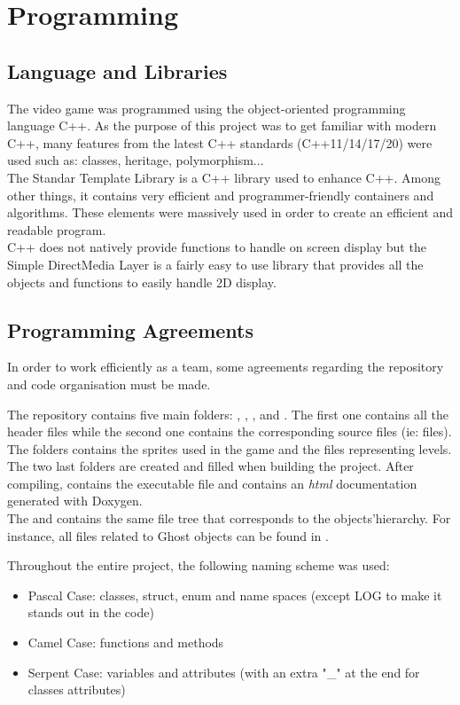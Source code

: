 \section{Programming}

\subsection{Language and Libraries}
The video game was programmed using the object-oriented programming language C++. As the purpose of this project was to get familiar with modern C++, many features from the latest C++ standards (C++11/14/17/20) were used such as: classes, heritage, polymorphism...\\
The Standar Template Library is a C++ library used to enhance C++. Among other things, it contains very efficient and programmer-friendly containers and algorithms. These elements were massively used in order to create an efficient and readable program.\\
C++ does not natively provide functions to handle on screen display but the Simple DirectMedia Layer is a fairly easy to use library that provides all the objects and functions to easily handle 2D display.\\

\subsection{Programming Agreements}
In order to work efficiently as a team, some agreements regarding the repository and code organisation must be made.

The repository contains five main folders: , , ,  and . The first one contains all the header files while the second one contains the corresponding source files (ie:  files). The  folders contains the sprites used in the game and the files representing levels. The two last folders are created and filled when building the project. After compiling,  contains the executable file and  contains an \textit{html} documentation generated with Doxygen.\cite{doxygen}\\
The  and  contains the same file tree that corresponds to the objects'hierarchy. For instance, all files related to \textsf{Ghost} objects can be found in .

Throughout the entire project, the following naming scheme was used:
\begin{itemize}
    \item Pascal Case: classes, struct, enum and name spaces (except \textsf{LOG} to make it stands out in the code)
    \item Camel Case: functions and methods
    \item Serpent Case: variables and attributes (with an extra "_" at the end for classes attributes)
\end{itemize}

